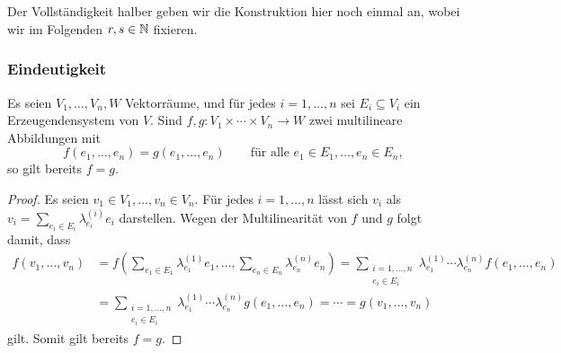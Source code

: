 \section{}





\subsection{}
Der Vollständigkeit halber geben wir die Konstruktion hier noch einmal an, wobei wir im Folgenden $r, s \in \mathbb{N}$ fixieren.



\subsubsection{Eindeutigkeit}

\begin{lemma}
  \label{lemma: multilinear maps are uniquely determined by generating sets}
  Es seien $V_1, \dotsc, V_n, W$ Vektorräume, und für jedes $i = 1, \dotsc, n$ sei $E_i \subseteq V_i$ ein Erzeugendensystem von $V$.
  Sind $f, g \colon V_1 \times \dotsb \times V_n \to W$ zwei multilineare Abbildungen mit
  \[
      f( e_1, \dotsc, e_n )
    = g( e_1, \dotsc, e_n)
    \qquad
    \text{für alle $e_1 \in E_1, \dotsc, e_n \in E_n$},
  \]
  so gilt bereits $f = g$.
\end{lemma}

\begin{proof}
  Es seien $v_1 \in V_1, \dotsc, v_n \in V_n$.
  Für jedes $i = 1, \dotsc, n$ lässt sich $v_i$ als $v_i = \sum_{e_i \in E_i} \lambda^{(i)}_{e_i} e_i$ darstellen.
  Wegen der Multilinearität von $f$ und $g$ folgt damit, dass
  \begin{align*}
        f(v_1, \dotsc, v_n)
    &=  f\left( \sum_{e_1 \in E_1} \lambda^{(1)}_{e_1} e_1, \dotsc, \sum_{e_n \in E_n} \lambda^{(n)}_{e_n} e_n \right)
     =  \sum_{\substack{i = 1, \dotsc, n \\ e_i \in E_i}} \lambda^{(1)}_{e_1} \dotsm \lambda^{(n)}_{e_n} f(e_1, \dotsc, e_n)
    \\
    &=  \sum_{\substack{i = 1, \dotsc, n \\ e_i \in E_i}} \lambda^{(1)}_{e_1} \dotsm \lambda^{(n)}_{e_n} g(e_1, \dotsc, e_n)
     =  \dotsb
     =  g(v_1, \dotsc, v_n)
  \end{align*}
  gilt.
  Somit gilt bereits $f = g$.
\end{proof}

